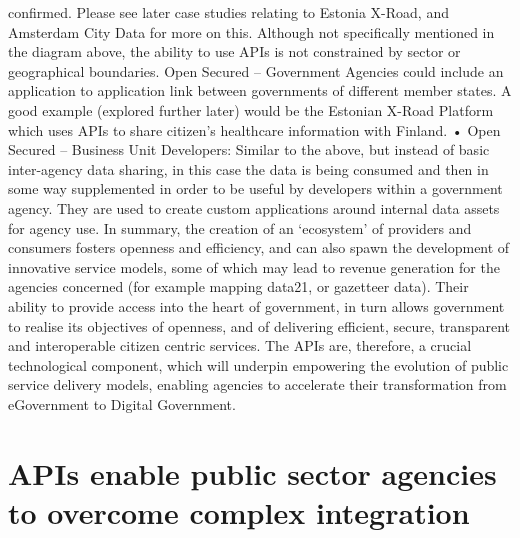 confirmed. Please see later case studies relating to Estonia X-Road, and Amsterdam City Data for
more on this.
Although not specifically mentioned in the diagram above, the ability to use APIs is not constrained
by sector or geographical boundaries. Open Secured – Government Agencies could include an
application to application link between governments of different member states. A good example
(explored further later) would be the Estonian X-Road Platform which uses APIs to share citizen’s
healthcare information with Finland.
• Open Secured – Business Unit Developers: Similar to the above, but instead of basic inter-agency
data sharing, in this case the data is being consumed and then in some way supplemented in order
to be useful by developers within a government agency. They are used to create custom
applications around internal data assets for agency use.
In summary, the creation of an ‘ecosystem’ of providers and consumers fosters openness and efficiency,
and can also spawn the development of innovative service models, some of which may lead to revenue
generation for the agencies concerned (for example mapping data21, or gazetteer data). Their ability to 
provide access into the heart of government, in turn allows government to realise its objectives of
openness, and of delivering efficient, secure, transparent and interoperable citizen centric services. The
APIs are, therefore, a crucial technological component, which will underpin empowering the evolution of
public service delivery models, enabling agencies to accelerate their transformation from eGovernment to
Digital Government.

\clearpage

\section{APIs enable public sector agencies to overcome complex integration}

